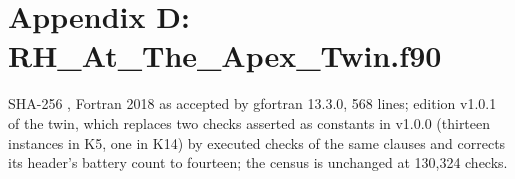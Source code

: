 \documentclass[10pt,twocolumn]{article}
\begin{document}
\endgroup

\hypertarget{appendix-d-rh_at_the_apex_twin.f90}{%
\section{Appendix D:
RH\_At\_The\_Apex\_Twin.f90}\label{appendix-d-rh_at_the_apex_twin.f90}}

SHA-256
\texttt{},
Fortran 2018 as accepted by gfortran 13.3.0, 568 lines; edition v1.0.1
of the twin, which replaces two checks asserted as constants in v1.0.0
(thirteen instances in K5, one in K14) by executed checks of the same
clauses and corrects its header's battery count to fourteen; the census
is unchanged at 130,324 checks.

\begingroup\scriptsize
\end{document}
